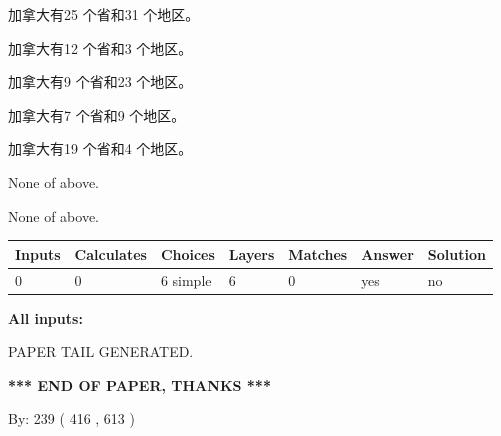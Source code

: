 \documentclass{ctexart}
\begin{document}
 
加拿大有25 个省和31 个地区。
 
 
加拿大有12 个省和3 个地区。
 
 
加拿大有9 个省和23 个地区。
 
 
加拿大有7 个省和9 个地区。
 
 
加拿大有19 个省和4 个地区。
 
 
 None of above.
 
 
\noindent{}
 
 
 None of above.
 
 
\noindent{}
 
 
   
   
   
   
\noindent\begin{tabular}{|l|l|l|l|l|l|l|}
 \hline
Inputs & Calculates & Choices & Layers & Matches & Answer & Solution \\ \hline
 0  & 
 0  & 
 6
  simple  
  & 
 6  & 
 0  & 
  yes & 
  no 
  \\ \hline
 \end{tabular}
   
   
   
   
\noindent{}
   
   
   
   
\noindent\vspace{0.1in}\hspace{-0.08in} {\textbf{\Large{All inputs: }}}
   
   
   
   
   
   
 \vspace{0.2in}
 
   
   
\vspace{2.0in} PAPER TAIL GENERATED.
   
   
   
   
\vspace{1.0in} 
{\textbf{\large{ *** END OF PAPER, THANKS *** }}} 
   
   
\hspace{1.0in} By: 
 239 ( 416 ,  613 )
   
\end{document}
